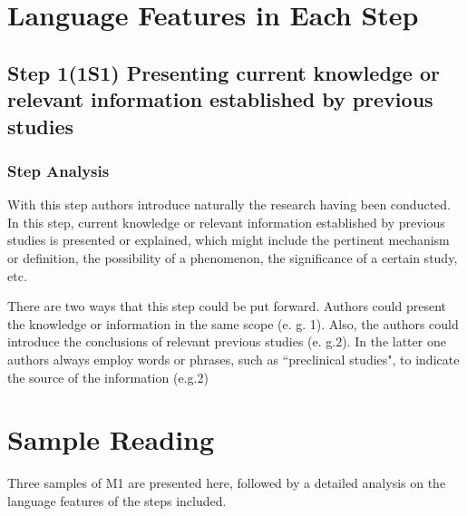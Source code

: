 \documentclass{ctexbook}
\begin{document}
\section{Language Features in Each Step}

  \subsection{Step 1(1S1) Presenting current knowledge or relevant information established by previous studies}
    \subsubsection{Step Analysis}
    With this step authors introduce naturally the research having been conducted. In this step, current knowledge or relevant information established by previous studies is presented or explained, which might include the pertinent mechanism or definition, the possibility of a phenomenon, the significance of a certain study, etc.
    
    There are two ways that this step could be put forward. Authors could present the knowledge or information in the same scope (e. g. 1). Also, the authors could introduce the conclusions of relevant previous studies (e. g.2). In the latter one authors always employ words or phrases, such as “preclinical studies", to indicate the source of the information (e.g.2)
    


\section{Sample Reading}

Three samples of M1 are presented here, followed by a detailed analysis on the language features of the steps included.
\end{document}
